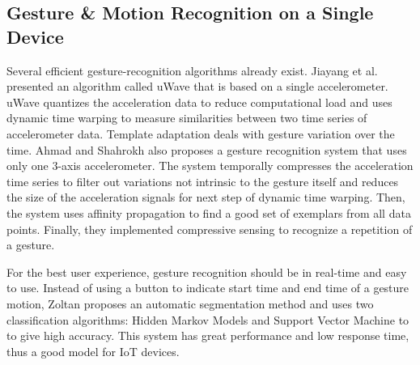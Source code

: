 
\subsection{Gesture \& Motion Recognition on a Single Device}

Several efficient gesture-recognition algorithms already exist. Jiayang et al. \cite{Liu:2009, LiuuWave} presented an algorithm called uWave that is based on a single accelerometer. uWave quantizes the acceleration data to reduce computational load and uses dynamic time warping to measure similarities between two time series of accelerometer data. Template adaptation deals with gesture variation over the time. Ahmad and Shahrokh \cite{Ahmad:2010} also proposes a gesture recognition system that uses only one 3-axis accelerometer. The system temporally compresses the acceleration time series to filter out variations not intrinsic to the gesture itself and reduces the size of the acceleration signals for next step of dynamic time warping. Then, the system uses affinity propagation to find a good set of exemplars from all data points. Finally, they implemented compressive sensing to recognize a repetition of a gesture. 

For the best user experience, gesture recognition should be in real-time and easy to use. Instead of using a button to indicate start time and end time of a gesture motion, Zoltan \cite{Zoltan} proposes an automatic segmentation method and uses two classification algorithms: Hidden Markov Models and Support Vector Machine to to give high accuracy. This system has great performance and low response time, thus a good model for \gls{IoT} devices.
